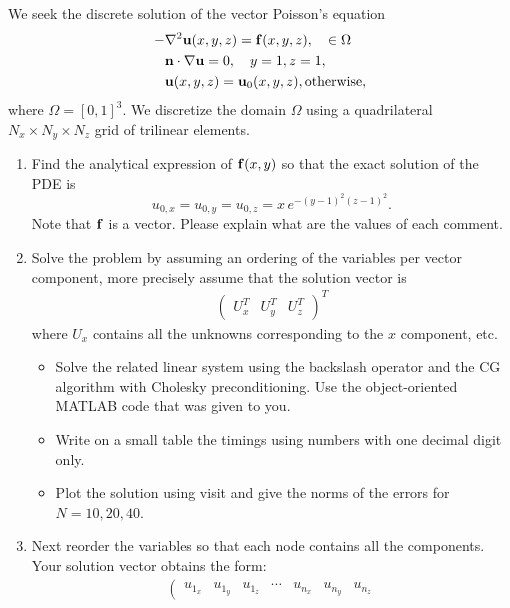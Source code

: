 \documentclass[unicode,11pt,a4paper,oneside,numbers=endperiod,openany]{scrartcl}
\def\u{{\bf u}}
\def\f{{\bf f}}
\def\n{{\bf n}}
\begin{document}
\setassignment
{}

We seek the discrete solution of the vector Poisson's equation
\begin{align*}
-&\nabla^2 \u(x, y, z) = \f(x,y, z), \quad \in \Omega \\
&\n \cdot \nabla \u   = 0, \quad y=1, z=1,\\
&\u(x, y, z) = \u_0(x, y, z), \text{otherwise},
\end{align*}
where $\Omega = [0,1]^3$. We discretize the domain $\Omega$ using a quadrilateral $N_x \times N_y \times N_z$ grid of trilinear elements. 
\begin{enumerate}
\item Find the analytical expression of $\f(x,y)$ so that the exact 
solution of the PDE is \[u_{0,x} = u_{0,y} = u_{0,z} =x\, e^{-(y-1)^2 (z-1)^2}.\] 
Note that $\f$ is a vector. Please explain what are the values of each comment.
\item Solve the problem by assuming an ordering of the variables per vector component,
more precisely assume that the solution vector is 
\begin{align}
\left (
\begin{array}{ccc}
U_x^T & U_y^T & U_z^T
\end{array}
\right )^T
\end{align}
where $U_x$ contains all the unknowns corresponding to the $x$ component, etc.
\begin{itemize}
\item Solve the related linear system using the backslash operator and the CG
algorithm with Cholesky preconditioning. Use the object-oriented MATLAB code that was given to you.
\item Write on a small table the timings using numbers with one decimal digit only.
\item Plot the solution using visit and give the norms of the errors for $N=10, 20, 40$.
\end{itemize}
\item Next reorder the variables so that each node contains all the components. 
Your solution vector obtains the form:
\begin{align}
\left (
\begin{array}{ccccccc}
u_{1_x} & u_{1_y} & u_{1_z} & \cdots & u_{n_x} & u_{n_y} & u_{n_z}

\end{array}
\end{align}
\end{enumerate}
\end{document}
